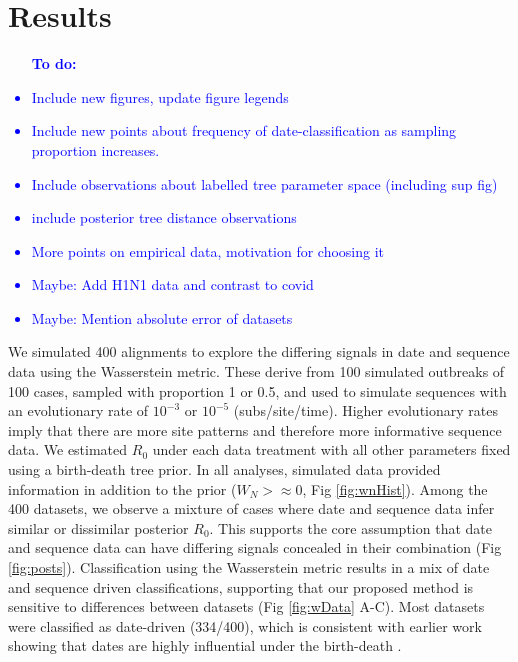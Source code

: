 \documentclass{article}
\begin{document}
\section*{Results}
\textcolor{blue}{\begin{itemize}
    \item [\textbf{To do:}]
    \item Include new figures, update figure legends
    \item Include new points about frequency of date-classification as sampling proportion increases.
    \item Include observations about labelled tree parameter space (including sup fig)
    \item include posterior tree distance observations
    \item More points on empirical data, motivation for choosing it
    \item Maybe: Add H1N1 data and contrast to covid
    \item Maybe: Mention absolute error of datasets
\end{itemize}}
We simulated 400 alignments to explore the differing signals in date and sequence data using the Wasserstein metric. These derive from 100 simulated outbreaks of 100 cases, sampled with proportion 1 or 0.5, and used to simulate sequences with an evolutionary rate of $10^{-3}$ or $10^{-5}$ (subs/site/time). Higher evolutionary rates imply that there are more site patterns and therefore more informative sequence data. We estimated $R_0$ under each data treatment with all other parameters fixed using a birth-death tree prior. In all analyses, simulated data provided information in addition to the prior ($W_{N}>\approx0$, Fig \ref{fig:wnHist}). Among the 400 datasets, we  observe a mixture of cases where date and sequence data infer similar or dissimilar posterior $R_{0}$. This supports the core assumption that date and sequence data can have differing signals concealed in their combination (Fig \ref{fig:posts}). Classification using the Wasserstein metric results in a mix of date and sequence driven classifications, supporting that our proposed method is sensitive to differences between datasets (Fig \ref{fig:wData} A-C). Most datasets were classified as date-driven (334/400), which is consistent with earlier work showing that dates are highly influential under the birth-death \citep{volz_sampling_2014}. 
\end{document}
